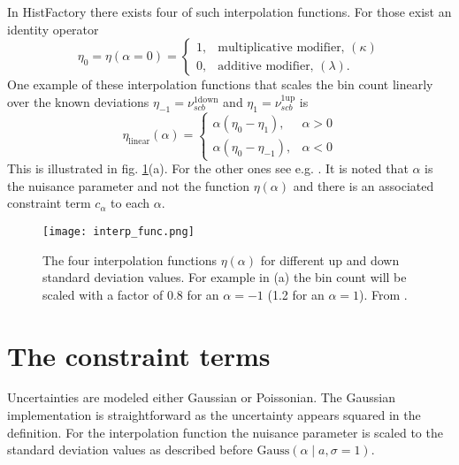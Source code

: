 In HistFactory there exists four of such interpolation functions. For those exist an identity operator 
\begin{equation}
    \eta_0=\eta (\alpha=0) =
    \begin{cases}
        1 ,& \text{multiplicative modifier, } (\kappa) \\
        0 ,& \text{additive modifier, } (\lambda).
    \end{cases}
\end{equation}
One example of these interpolation functions that scales the bin count linearly over the known deviations $\eta_{-1}=\nu_{scb}^\mathrm{1down}$ and $\eta_{1}=\nu_{scb}^\mathrm{1up}$ is
\begin{equation}
    \eta_\mathrm{linear}(\alpha)=
    \begin{cases}
        \alpha(\eta_0 - \eta_1) ,& \alpha>0\\
        \alpha(\eta_0 - \eta_{-1}) ,& \alpha<0
    \end{cases}
\end{equation}
This is illustrated in fig. \ref{fig:interp_func}(a). For the other ones see e.g. \citep{heinrich2019searches}. It is noted that $\alpha$ is the nuisance parameter and not the function $\eta(\alpha)$ and there is an associated constraint term $c_\alpha$ to each $\alpha$.
\begin{figure}
    \centering
    \texttt{[image: interp\_func.png]}
        \caption[]{The four interpolation functions $\eta(\alpha)$ for different up and down standard deviation values. For example in (a) the bin count will be scaled with a factor of 0.8 for an $\alpha=-1$ (1.2 for an $\alpha=1$). From \citep{cranmer2012histfactory}.}
    \label{fig:interp_func}    
\end{figure}

\section{The constraint terms}\label{sec:constraint_terms}
Uncertainties are modeled either Gaussian or Poissonian. The Gaussian implementation is straightforward as the uncertainty appears squared in the definition. For the interpolation function the nuisance parameter is scaled to the standard deviation values as described before $\mathrm{Gauss}(\alpha \mid a, \sigma=1)$. 

